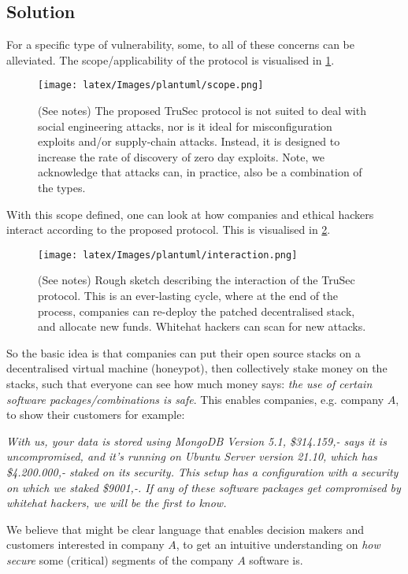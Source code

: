 \subsection{Solution}
For a specific type of vulnerability, some, to all of these concerns can be alleviated. The scope/applicability of the protocol is visualised in \cref{fig:protocol_scope}.
\begin{figure}[H]
    \centering
    \texttt{[image: latex/Images/plantuml/scope.png]}
    \caption{(See notes) The proposed TruSec protocol is not suited to deal with social engineering attacks, nor is it ideal for misconfiguration exploits and/or supply-chain attacks. Instead, it is designed to increase the rate of discovery of zero day exploits. Note, we acknowledge that attacks can, in practice, also be a combination of the types.}
    \label{fig:protocol_scope}
\end{figure}

\noindent With this scope defined, one can look at how companies and ethical hackers interact according to the proposed protocol. This is visualised in \cref{fig:interaction}.

\begin{figure}[H]
    \centering
    \texttt{[image: latex/Images/plantuml/interaction.png]}
    \caption{(See notes) Rough sketch describing the interaction of the TruSec protocol. This is an ever-lasting cycle, where at the end of the process, companies can re-deploy the patched decentralised stack, and allocate new funds. Whitehat hackers can scan for new attacks.}
    \label{fig:interaction}
\end{figure}
\noindent So the basic idea is that companies can put their open source stacks on a decentralised virtual machine (honeypot), then collectively stake money on the stacks, such that everyone can see how much money says: \textit{the use of certain software packages/combinations is safe}. This enables companies, e.g. company $A$, to show their customers for example:

\textit{With us, your data is stored using MongoDB Version 5.1, \$314.159,- says it is uncompromised, and it's running on Ubuntu Server version 21.10, which has \$4.200.000,- staked on its security. This setup has a configuration with a security on which we staked \$9001,-. If any of these software packages get compromised by whitehat hackers, we will be the first to know.}

We believe that might be clear language that enables decision makers and customers interested in company $A$, to get an intuitive understanding on \textit{how secure} some (critical) segments of the company $A$ software is.

